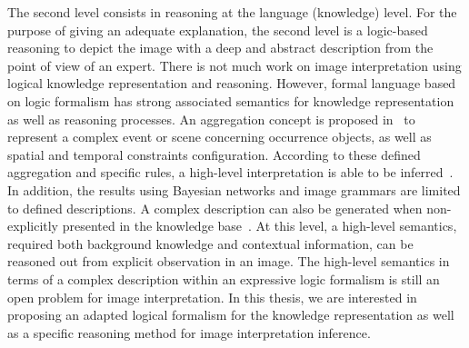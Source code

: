 \documentclass{article}
\begin{document}
The second level consists in reasoning at the language (knowledge) level.
For the purpose of giving an adequate explanation, the second level is a logic-based reasoning to depict the image with a deep and abstract description from the point of view of an expert.
There is not much work on image interpretation using logical knowledge representation and reasoning. 
However, formal language based on logic formalism has  strong associated semantics for knowledge representation as well as reasoning processes. 
An aggregation concept is proposed in~\cite{Espinosa07multimedia} to represent a complex event or scene concerning occurrence objects, as well as spatial and temporal constraints configuration.
According to these defined aggregation and specific rules, a high-level interpretation is able to be inferred~\cite{neumann2008scene}.
In addition, the results using Bayesian networks and image grammars are limited to defined descriptions.
A complex description can also be generated when non-explicitly presented in the knowledge base~\cite{atif2014explanatory}.
At this level, a high-level semantics, required both background knowledge and contextual information, can be reasoned out from explicit observation in an image.
The high-level semantics in terms of a complex description within an expressive logic formalism is still an open problem for image interpretation.
In this thesis, we are interested in proposing an adapted logical formalism for the knowledge representation as well as a specific reasoning method for image interpretation inference.




% 
% 
\end{document}
